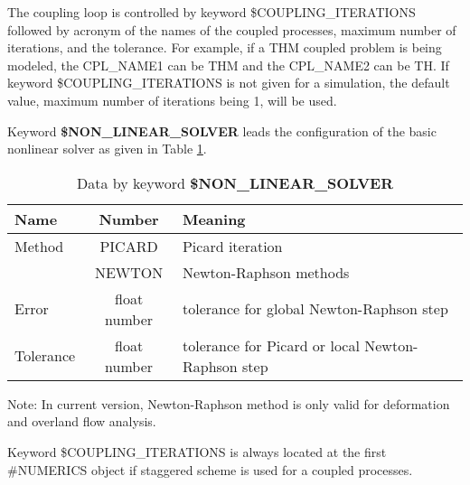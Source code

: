 The coupling loop is controlled by keyword \mbox{\$COUPLING\_ITERATIONS} followed by acronym of the names of
the coupled processes, maximum number of iterations, and the tolerance.  For example, if a THM coupled problem
is being modeled, the \mbox{CPL\_NAME1} can be \mbox{THM} and the \mbox{CPL\_NAME2} can be \mbox{TH}. If keyword
\mbox{\$COUPLING\_ITERATIONS} is not given for a simulation, the default value, maximum number of iterations being 1, will be used.


Keyword \textbf{\$NON\_LINEAR\_SOLVER} leads the configuration of the basic nonlinear solver as given in
 Table \ref{tab_num2}.
{\ttfamily
  \small
\begin{table}[!htb]
\centering
\begin{tabular}{|l|c|l|}
  \hline
  Name &Number & Meaning  \\
  \hline
  \hline %
  Method &  PICARD &Picard iteration\\
  &  NEWTON  &Newton-Raphson methods\\
 \hline
  Error &  float number  &tolerance for global Newton-Raphson step\\
 \hline
  Tolerance &  float number  &tolerance for Picard or local Newton-Raphson step\\
\hline
 \hline
\end{tabular}
\caption{Data by keyword \textbf{\$NON\_LINEAR\_SOLVER}}
\label{tab_num2}
\end{table}
}
Note: In current version, Newton-Raphson method is only valid for deformation and overland flow analysis.

Keyword \mbox{\$COUPLING\_ITERATIONS} is always located at the first \mbox{\#NUMERICS} object if staggered scheme is
 used for a coupled processes.
